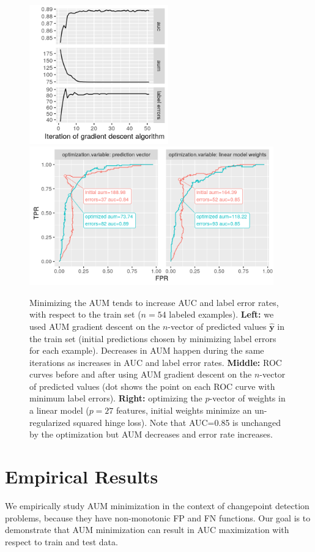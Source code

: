 \documentclass{article}
\begin{document}
\begin{figure}[ht]
\vskip 0.2in
\begin{center}
\includegraphics[height=6cm]{figure-aum-optimized-iterations.png}
\includegraphics[height=6cm]{figure-aum-train-both.png}
\vskip -0.5cm
\caption{
Minimizing the AUM tends to increase AUC and label error rates, with respect to the train set ($n=54$ labeled examples).
\textbf{Left:} we used AUM gradient descent on the $n$-vector of predicted values $\mathbf{\hat y}$ in the train set (initial predictions chosen by minimizing label errors for each example). Decreases in AUM happen during the same iterations as increases in AUC and label error rates. 
\textbf{Middle:} ROC curves before and after using AUM gradient descent on the $n$-vector of predicted values (dot shows the point on each ROC curve with minimum label errors).
\textbf{Right:} optimizing the $p$-vector of weights in a linear model ($p=27$ features, initial weights minimize an un-regularized squared hinge loss). 
Note that AUC=0.85 is unchanged by the optimization but AUM decreases and error rate increases.
}
\label{fig:aum-optimized}
\end{center}
\vskip -0.2in
\end{figure}

\section{Empirical Results}
\label{sec:results}
We empirically study AUM minimization in the context of changepoint detection problems, because they have non-monotonic FP and FN functions.
Our goal is to demonstrate that AUM minimization can result in AUC maximization with respect to train and test data.
\end{document}
